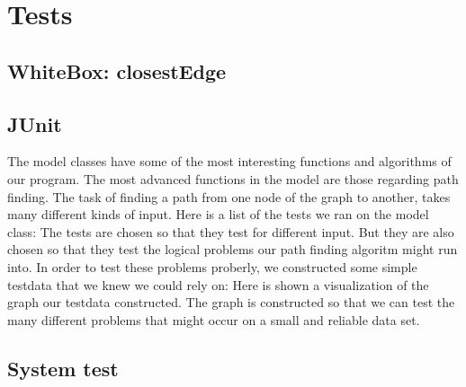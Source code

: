 \chapter{Tests}
\label{TEST}
\section{WhiteBox: closestEdge}
\label{TEST-CE}

\section{JUnit}
\label{TEST-JU}
The model classes have some of the most interesting functions and algorithms of
our program. The most advanced functions in the model are those regarding path
finding. The task of finding a path from one node of the graph to another,
takes many different kinds of input. Here is a list of the tests we ran on the
model class:
The tests are chosen so that they test for different input. But they are also
chosen so that they test the logical problems our path finding algoritm might
run into. In order to test these problems proberly, we constructed some simple
testdata that we knew we could rely on:
Here is shown a visualization of the graph our testdata constructed. The graph
is constructed so that we can test the many different problems that might occur
on a small and reliable data set. 
\section{System test}
\label{TEST-ST}